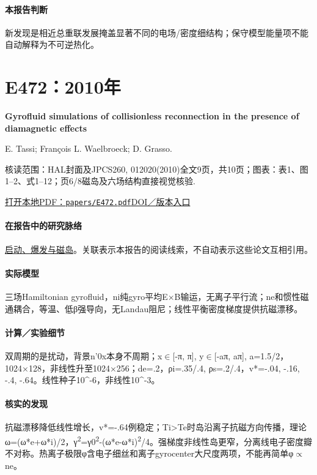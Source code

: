 \documentclass[UTF8,a4paper,11pt,openany,fontset=fandol]{ctexbook}
\begin{document}
\paragraph{本报告判断}新发现是相近总重联发展掩盖显著不同的电场/密度细结构；保守模型能量项不能自动解释为不可逆热化。

\section{E472：2010年}\label{paper:E472}

\textbf{Gyrofluid simulations of collisionless reconnection in the presence of diamagnetic effects}\citep{E472}\

E. Tassi;  François L. Waelbroeck;  D. Grasso.

\textsf{核读范围：}HAL封面及JPCS260, 012020(2010)全文9页，共10页；\textsf{图表：}表1、图1–2、式1–12；页6/8磁岛及六场结构直接视觉核验.

\href{run:../papers/E472.pdf}{打开本地PDF：\texttt{papers/E472.pdf}}\quad\href{http://porto.polito.it/2380084/1/2380084.pdf}{DOI／版本入口}

\paragraph{在报告中的研究脉络}\hyperref[story:onset]{启动、爆发与磁岛}。关联表示本报告的阅读线索，不自动表示这些论文互相引用。

\paragraph{实际模型}三场Hamiltonian gyrofluid，ni纯gyro平均E×B输运，无离子平行流；ne和惯性磁通耦合，等温、低β强导向，无Landau阻尼；线性平衡密度梯度提供抗磁漂移。

\paragraph{计算／实验细节}双周期的是扰动，背景n'0x本身不周期；x\ensuremath{\in}[-π, π], y\ensuremath{\in}[-aπ, aπ], a=1.5/2，1024×128，非线性升至1024×256；de=.2，ρi=.35/.4, ρs=.2/.4，v*=-.04, -.16, -.4, -.64。线性种子10\textasciicircum{}-6，非线性10\textasciicircum{}-3。

\paragraph{核实的发现}抗磁漂移降低线性增长，v*=-.64例稳定；Ti>Te时岛沿离子抗磁方向传播，理论ω=(ω*e+ω*i)/2，γ\textsuperscript{2}=γ0\textsuperscript{2}-(ω*e-ω*i)\textsuperscript{2}/4。强梯度非线性岛更窄，分离线电子密度瓣不对称。热离子极限φ含电子细丝和离子gyrocenter大尺度两项，不能再简单φ\ensuremath{\propto}ne。
\end{document}

